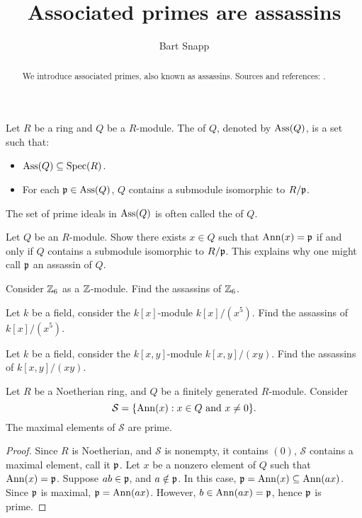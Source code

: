 \documentclass{ximera}
\author{Bart Snapp}
\title{Associated primes are assassins}
\begin{document}
\begin{abstract}
  We introduce associated primes, also known as assassins. Sources and
  references: \cite{sD2008, dE1995, mR1995,jpS2000}.
\end{abstract}
\maketitle

\begin{definition}
  Let $R$ be a ring and $Q$ be a $R$-module. The  of
  $Q$, denoted by $\operatorname{Ass}(Q)$, is a set such that:
  \begin{itemize}
  \item $\operatorname{Ass}(Q)\subseteq\operatorname{Spec}(R)$.
  \item For each $\mathfrak{p}\in\operatorname{Ass}(Q)$, $Q$ contains a submodule isomorphic
    to $R/\mathfrak{p}$.
  \end{itemize}
  The set of prime ideals in $\operatorname{Ass}(Q)$ is often called the
   of $Q$.
\end{definition}

\begin{exercise}
  Let $Q$ be an $R$-module. Show there exists $x\in Q$ such that
  $\operatorname{Ann}(x) = \mathfrak{p}$ if and only if $Q$ contains a submodule isomorphic to
  $R/\mathfrak{p}$. This explains why one might call $\mathfrak{p}$ an assassin of $Q$.
\end{exercise}

\begin{exercise}
  Consider $\mathbb Z_6$ as a $\mathbb Z$-module. Find the assassins of $\mathbb Z_6$.
\end{exercise}

\begin{exercise}
  Let $k$ be a field, consider the $k[x]$-module $k[x]/(x^5)$. Find
  the assassins of $k[x]/(x^5)$.
\end{exercise}

\begin{exercise}
  Let $k$ be a field, consider the $k[x,y]$-module $k[x,y]/(xy)$. Find
  the assassins of $k[x,y]/(xy)$.
\end{exercise}




\begin{proposition}
  Let $R$ be a Noetherian ring, and $Q$ be a finitely generated
  $R$-module. Consider
  \[
  \mathcal{S} = \{\operatorname{Ann}(x): x\in Q\text{ and } x\ne0\}.
  \]
  The maximal elements of $\mathcal{S}$ are prime.
  \begin{proof}
    Since $R$ is Noetherian, and $\mathcal{S}$ is nonempty, it
    contains $(0)$, $\mathcal{S}$ contains a maximal element, call it
    $\mathfrak{p}$.  Let $x$ be a nonzero element of $Q$ such that $\operatorname{Ann}(x) =
    \mathfrak{p}$.  Suppose $ab\in\mathfrak{p}$, and $a\notin\mathfrak{p}$.  In this case,
    $\mathfrak{p}=\operatorname{Ann}(x) \subseteq \operatorname{Ann}(ax)$. Since $\mathfrak{p}$ is maximal, $\mathfrak{p} =
    \operatorname{Ann}(ax)$. However, $b\in\operatorname{Ann}(ax) = \mathfrak{p}$, hence $\mathfrak{p}$ is prime.
  \end{proof}
\end{proposition}
\end{document}
